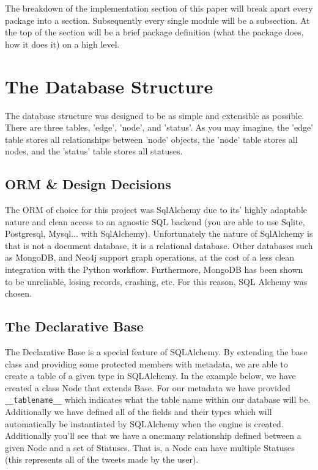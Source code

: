 The breakdown of the implementation section of this paper will break apart every package into a section. Subsequently every single module will be a subsection. At the top of the section will be a brief package definition (what the package does, how it does it) on a high level.

\section{The Database Structure}
The database structure was designed to be as simple and extensible as possible. There are three tables, 'edge', 'node', and 'status'. As you may imagine, the 'edge' table stores all relationships between 'node' objects, the 'node' table stores all nodes, and the 'status' table stores all statuses.

\subsection{ORM \& Design Decisions}
The ORM of choice for this project was SqlAlchemy due to its' highly adaptable nature and clean access to an agnostic SQL backend (you are able to use Sqlite, Postgresql, Mysql... with SqlAlchemy). Unfortunately the nature of SqlAlchemy is that is not a document database, it is a relational database. Other databases such as MongoDB, and Neo4j support graph operations, at the cost of a less clean integration with the Python workflow. Furthermore, MongoDB has been shown to be unreliable, losing records, crashing, etc. For this reason, SQL Alchemy was chosen.

\subsection{The Declarative Base}
The Declarative Base is a special feature of SQLAlchemy. By extending the base class and providing some protected members with metadata, we are able to create a table of a given type in SQLAlchemy. In the example below, we have created a class Node that extends Base. For our metadata we have provided \verb|__tablename__| which indicates what the table name within our database will be. Additionally we have defined all of the fields and their types which will automatically be instantiated by SQLAlchemy when the engine is created. Additionally you'll see that we have a one:many relationship defined between a given Node and a set of Statuses. That is, a Node can have multiple Statuses (this represents all of the tweets made by the user).


